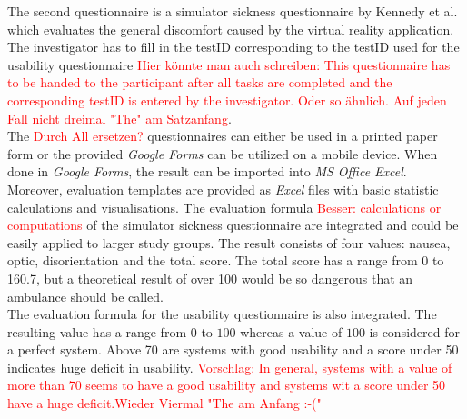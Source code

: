 The second questionnaire is a simulator sickness questionnaire by Kennedy et al. \citep{ssq} which evaluates the general discomfort caused by the virtual reality application. The investigator has to fill in the testID corresponding to the testID used for the usability questionnaire \textcolor{red}{Hier könnte man auch schreiben: This questionnaire has to be handed to the participant after all tasks are completed and the corresponding testID is entered by the investigator. Oder so ähnlich. Auf jeden Fall nicht dreimal "The" am Satzanfang}. \\

The \textcolor{red}{Durch All ersetzen?} questionnaires can either be used in a printed paper form or the provided \textit{Google Forms} can be utilized on a mobile device. When done in \textit{Google Forms}, the result can be imported into \textit{MS Office Excel}. Moreover, evaluation templates are provided as \textit{Excel} files with basic statistic calculations and visualisations. The evaluation formula \textcolor{red}{Besser: calculations or computations} of the simulator sickness questionnaire are integrated and could be easily applied to larger study groups. The result consists of four values: nausea, optic, disorientation and the total score. The total score has a range from 0 to 160.7, but a theoretical result of over 100 would be so dangerous that an ambulance should be called. \\
The evaluation formula for the usability questionnaire is also integrated. The resulting value has a range from $0$ to $100$ whereas a value of $100$ is considered for a perfect system. Above 70 are systems with good usability and a score under 50 indicates huge deficit in usability. \textcolor{red}{Vorschlag: In general, systems with a value of more than 70 seems to have a good usability and systems wit a score under 50 have a huge deficit.}\textcolor{red}{Wieder Viermal "The am Anfang :-("}




\newpage